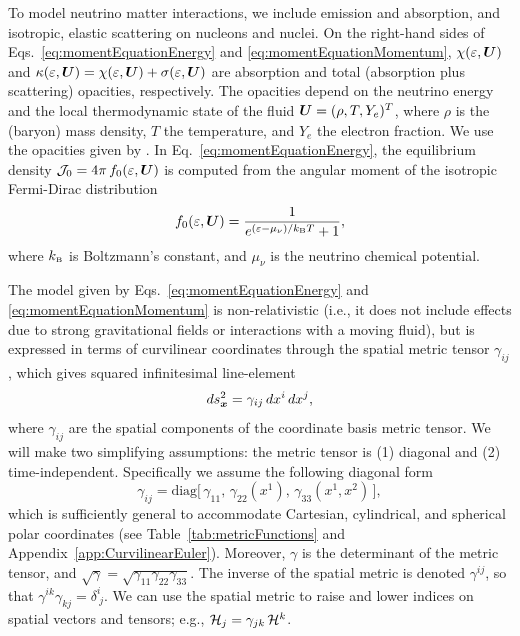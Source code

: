 \documentclass[10pt,preprint]{aastex}
\begin{document}
To model neutrino matter interactions, we include emission and absorption, and isotropic, elastic scattering on nucleons and nuclei.  
On the right-hand sides of Eqs.~\eqref{eq:momentEquationEnergy} and \eqref{eq:momentEquationMomentum}, $\chi(\varepsilon,\boldsymbol{U})$ and $\kappa(\varepsilon,\boldsymbol{U})=\chi(\varepsilon,\boldsymbol{U})+\sigma(\varepsilon,\boldsymbol{U})$ are absorption and total (absorption plus scattering) opacities, respectively.  
The opacities depend on the neutrino energy and the local thermodynamic state of the fluid $\boldsymbol{U}=(\rho,T,Y_{e})^{T}$, where $\rho$ is the (baryon) mass density, $T$ the temperature, and $Y_{e}$ the electron fraction.  
We use the opacities given by \citet{bruenn_1985}.  
In Eq.~\eqref{eq:momentEquationEnergy}, the equilibrium density $\mathcal{J}_{0}=4\pi\,f_{0}(\varepsilon,\boldsymbol{U})$ is computed from the angular moment of the isotropic Fermi-Dirac distribution
\begin{equation}
  f_{0}(\varepsilon,\boldsymbol{U})=\frac{1}{e^{(\varepsilon-\mu_{\nu})/k_{\mbox{\tiny B}}T}+1},
\end{equation}
where $k_{\mbox{\tiny B}}$ is Boltzmann's constant, and $\mu_{\nu}$ is the neutrino chemical potential.  

The model given by Eqs.~\eqref{eq:momentEquationEnergy} and \eqref{eq:momentEquationMomentum} is non-relativistic (i.e., it does not include effects due to strong gravitational fields or interactions with a moving fluid), but is expressed in terms of curvilinear coordinates through the spatial metric tensor $\gamma_{ij}$, which gives squared infinitesimal line-element
\begin{equation}
  ds_{\boldsymbol{x}}^{2}=\gamma_{ij}\,dx^{i}\,dx^{j},
\end{equation}
where $\gamma_{ij}$ are the spatial components of the coordinate basis metric tensor.  
We will make two simplifying assumptions: the metric tensor is (1) diagonal and (2) time-independent.  
Specifically we assume the following diagonal form
\begin{equation}
  \gamma_{ij}
  =\mbox{diag}\big[\,\gamma_{11},\,\gamma_{22}(x^{1}),\,\gamma_{33}(x^{1},x^{2})\,\big], 
  \label{eq:threeMetric}
\end{equation}
which is sufficiently general to accommodate Cartesian, cylindrical, and spherical polar coordinates (see Table~\ref{tab:metricFunctions} and Appendix~\ref{app:CurvilinearEuler}).  
Moreover, $\gamma$ is the determinant of the metric tensor, and $\sqrt{\gamma}=\sqrt{\gamma_{11}\gamma_{22}\gamma_{33}}$.  
The inverse of the spatial metric is denoted $\gamma^{ij}$, so that $\gamma^{ik}\gamma_{kj}=\delta^{i}_{~j}$.  
We can use the spatial metric to raise and lower indices on spatial vectors and tensors; e.g., $\mathcal{H}_{j}=\gamma_{jk}\,\mathcal{H}^{k}$.  
\end{document}
